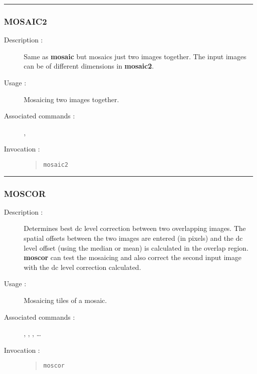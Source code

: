 \hrule 
\subsubsection*{\label{MOSAIC2}MOSAIC2}

\begin{description}

\item[Description :] Same as {\bf mosaic} but mosaics just two images
together.  The input images can be of different dimensions in {\bf mosaic2}.

\item[Usage :] Mosaicing two images together.

\item[Associated commands :] {\tt {}}, 
{\tt {}}

\item[Invocation :]

\begin{quote}{\tt  mosaic2 }\end{quote}

\end{description}

\hrule 
\subsubsection*{\label{MOSCOR}MOSCOR}

\begin{description}

\item[Description :] Determines best dc level correction between two
overlapping images. The spatial offsets between the two images are
entered (in pixels) and the dc level offset (using the median or mean)
is calculated in the overlap region.  {\bf moscor} can test the
mosaicing and also correct the second input image with the dc level
correction calculated.

\item[Usage :] Mosaicing tiles of a mosaic.

\item[Associated commands :] {\tt {}}, 
{\tt {}}, {\tt {}}, 
{\tt {}} \ldots

\item[Invocation :]

\begin{quote}{\tt  moscor }\end{quote}

\end{description}

